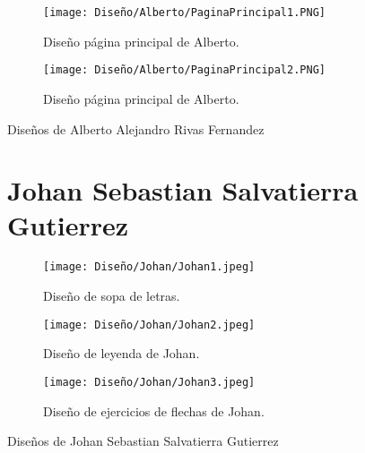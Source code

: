 \begin{figure}[h!]
  \ContinuedFloat
  \begin{subfigure}{\textwidth}
    \centering
    \texttt{[image: Diseño/Alberto/PaginaPrincipal1.PNG]}
    \caption{Diseño página principal de Alberto.}
    \label{AlbertoPaginaPrincipal1}
  \end{subfigure}

  \begin{subfigure}{\textwidth}
    \centering
    \texttt{[image: Diseño/Alberto/PaginaPrincipal2.PNG]}
    \caption{Diseño página principal de Alberto.}
    \label{AlbertoPaginaPrincipal2}
  \end{subfigure}

  \caption{Diseños de Alberto Alejandro Rivas Fernandez}
  \label{fig:disenyoAlberto}
\end{figure}


\begin{figure}[h!]
  \section{Johan Sebastian Salvatierra Gutierrez}
  \begin{subfigure}{\textwidth}
    \centering
    \texttt{[image: Diseño/Johan/Johan1.jpeg]}
    \caption{Diseño de sopa de letras.}
    \label{Johan1}
  \end{subfigure}

  \begin{subfigure}{\textwidth}
    \centering
    \texttt{[image: Diseño/Johan/Johan2.jpeg]}
    \caption{Diseño de leyenda de Johan.}
    \label{Johan2}
  \end{subfigure}

  \begin{subfigure}{\textwidth}
    \centering
    \texttt{[image: Diseño/Johan/Johan3.jpeg]}
    \caption{Diseño de ejercicios de flechas de Johan.}
    \label{Johan3}
  \end{subfigure}

  \caption{Diseños de Johan Sebastian Salvatierra Gutierrez}
  \label{fig:disenyoJohan}
\end{figure}

